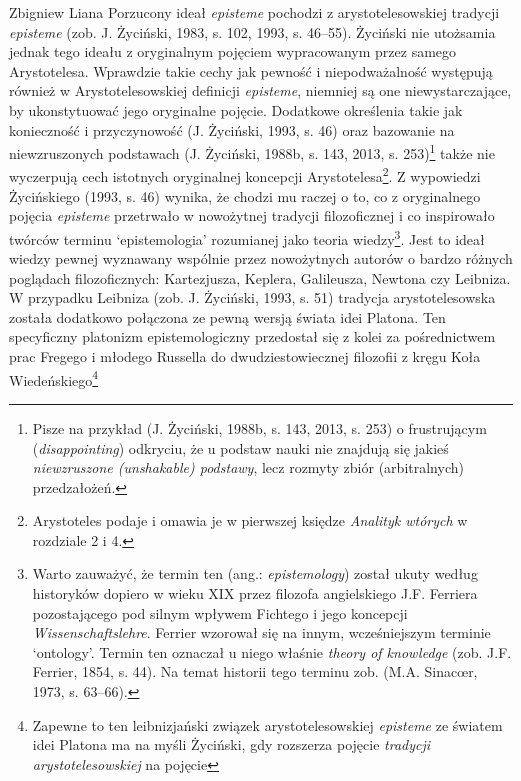 \begin{artplenv}{Zbigniew Liana}
Porzucony ideał \textit{episteme} pochodzi z arystotelesowskiej tradycji \textit{episteme} \label{ref:RNDRmhyRD3ZvW}(zob. J.
Życiński, 1983, s. 102, 1993, s. 46–55). Życiński nie utożsamia jednak tego ideału z oryginalnym pojęciem wypracowanym
przez samego Arystotelesa. Wprawdzie takie cechy jak pewność i niepodważalność występują również w Arystotelesowskiej
definicji \textit{episteme}, niemniej są one niewystarczające, by ukonstytuować jego oryginalne pojęcie. Dodatkowe
określenia takie jak konieczność i przyczynowość \label{ref:RNDUffssKrdla}(J. Życiński, 1993, s. 46) oraz bazowanie na
niewzruszonych podstawach \label{ref:RNDxd5cHMOpD0}(J. Życiński, 1988b, s. 143, 2013, s. 253)\footnote{Pisze na
	przykład \label{ref:RNDydmrxn78a6}(J. Życiński, 1988b, s. 143, 2013, s. 253) o frustrującym (\textit{disappointing})
	odkryciu, że u podstaw nauki nie znajdują się jakieś \textit{niewzruszone (unshakable) podstawy}, lecz rozmyty zbiór
	(arbitralnych) przedzałożeń.} także nie wyczerpują cech istotnych oryginalnej koncepcji
Arystotelesa\footnote{Arystoteles podaje i omawia je w pierwszej księdze \textit{Analityk wtórych} w rozdziale 2 i 4.}. Z
wypowiedzi Życińskiego \label{ref:RNDawumYBBRbe}(1993, s. 46) wynika, że chodzi mu raczej o to, co z oryginalnego
pojęcia \textit{episteme} przetrwało w nowożytnej tradycji filozoficznej i co inspirowało twórców terminu ‘epistemologia’
rozumianej jako teoria wiedzy\footnote{Warto zauważyć, że termin ten (ang.: \textit{epistemology}) został ukuty według
	historyków dopiero w wieku XIX przez filozofa angielskiego J.F. Ferriera pozostającego pod silnym wpływem Fichtego i
	jego koncepcji \textit{Wissenschaftslehre}. Ferrier wzorował się na innym, wcześniejszym terminie ‘ontology’. Termin ten
	oznaczał u niego właśnie \textit{theory of knowledge} \label{ref:RNDLNW5r1yicU}(zob. J.F. Ferrier, 1854, s. 44). Na temat
	historii tego terminu zob. \label{ref:RNDfrxMechpbI}(M.A. Sinacœr, 1973, s. 63–66).}. Jest to ideał wiedzy pewnej
wyznawany wspólnie przez nowożytnych autorów o bardzo różnych poglądach filozoficznych: Kartezjusza, Keplera,
Galileusza, Newtona czy Leibniza. W przypadku Leibniza \label{ref:RNDgl3cIrrlVL}(zob. J. Życiński, 1993, s. 51)
tradycja arystotelesowska została dodatkowo połączona ze pewną wersją świata idei Platona. Ten specyficzny platonizm
epistemologiczny przedostał się z kolei za pośrednictwem prac Fregego i młodego Russella do dwudziestowiecznej
filozofii z kręgu Koła Wiedeńskiego\footnote{Zapewne to ten leibnizjański związek arystotelesowskiej \textit{episteme} ze
	światem idei Platona ma na myśli Życiński, gdy rozszerza pojęcie \textit{tradycji arystotelesowskiej} na pojęcie
}
\end{artplenv}

